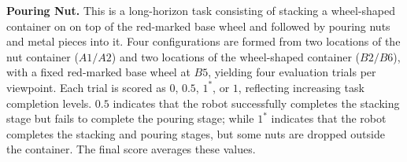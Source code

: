 \textbf{Pouring Nut.}
This is a long-horizon task consisting of stacking a wheel-shaped container on on top of the red-marked base wheel and followed by pouring nuts and metal pieces into it. Four configurations are formed from two locations of the nut container ($A1/A2$) and two locations of the wheel-shaped container ($B2/B6$), with a fixed red-marked base wheel at $B5$, yielding four evaluation trials per viewpoint. Each trial is scored as $0$, $0.5$, $1^*$, or $1$, reflecting increasing task completion levels. $0.5$ indicates that the robot successfully completes the stacking stage but fails to complete the pouring stage; while $1^*$ indicates that the robot completes the stacking and pouring stages, but some nuts are dropped outside the container. The final score averages these values.


